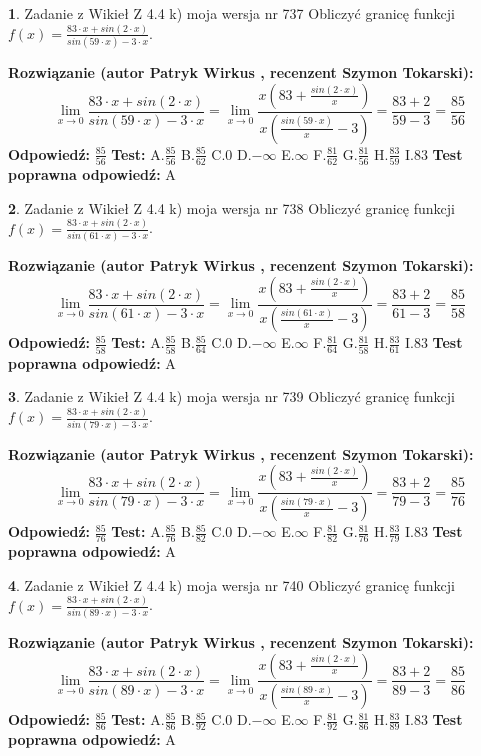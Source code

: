 \documentclass[12pt, a4paper]{article}
\theoremstyle{definition} %
\newtheorem{zad}{}
\newcommand{\zadStart}[1]{\begin{zad}#1\newline}
\newcommand{\zadStop}{\end{zad}}
\newcommand{\rozwStart}[2]{\noindent \textbf{Rozwiązanie (autor #1 , recenzent #2): }\newline}
\newcommand{\rozwStop}{\newline}
\newcommand{\odpStart}{\noindent \textbf{Odpowiedź:}\newline}
\newcommand{\odpStop}{\newline}
\newcommand{\testStart}{\noindent \textbf{Test:}\newline}
\newcommand{\testStop}{\newline}
\newcommand{\kluczStart}{\noindent \textbf{Test poprawna odpowiedź:}\newline}
\newcommand{\kluczStop}{\newline}
\begin{document}
\zadStart{Zadanie z Wikieł Z 4.4 k) moja wersja nr 737}
Obliczyć granicę funkcji $f(x)=\frac{83\cdot x +sin(2\cdot x)}{sin(59\cdot x) -3\cdot x}$.
\zadStop
\rozwStart{Patryk Wirkus}{Szymon Tokarski}
$$\lim\limits_{x\to 0}\frac{83\cdot x +sin(2\cdot x)}{sin(59\cdot x) -3\cdot x}
=\lim\limits_{x\to 0}\frac{x(83+\frac{sin(2\cdot x)}{x})}{x(\frac{sin(59\cdot x)}{x}-3)}
=\frac{83+2}{59-3} = \frac{85}{56}$$
\rozwStop
\odpStart
$\frac{85}{56}$
\odpStop
\testStart
A.$\frac{85}{56}$
B.$\frac{85}{62}$
C.$0$
D.$-\infty$
E.$\infty$
F.$\frac{81}{62}$
G.$\frac{81}{56}$
H.$\frac{83}{59}$
I.$83$
\testStop
\kluczStart
A
\kluczStop



\zadStart{Zadanie z Wikieł Z 4.4 k) moja wersja nr 738}
Obliczyć granicę funkcji $f(x)=\frac{83\cdot x +sin(2\cdot x)}{sin(61\cdot x) -3\cdot x}$.
\zadStop
\rozwStart{Patryk Wirkus}{Szymon Tokarski}
$$\lim\limits_{x\to 0}\frac{83\cdot x +sin(2\cdot x)}{sin(61\cdot x) -3\cdot x}
=\lim\limits_{x\to 0}\frac{x(83+\frac{sin(2\cdot x)}{x})}{x(\frac{sin(61\cdot x)}{x}-3)}
=\frac{83+2}{61-3} = \frac{85}{58}$$
\rozwStop
\odpStart
$\frac{85}{58}$
\odpStop
\testStart
A.$\frac{85}{58}$
B.$\frac{85}{64}$
C.$0$
D.$-\infty$
E.$\infty$
F.$\frac{81}{64}$
G.$\frac{81}{58}$
H.$\frac{83}{61}$
I.$83$
\testStop
\kluczStart
A
\kluczStop



\zadStart{Zadanie z Wikieł Z 4.4 k) moja wersja nr 739}
Obliczyć granicę funkcji $f(x)=\frac{83\cdot x +sin(2\cdot x)}{sin(79\cdot x) -3\cdot x}$.
\zadStop
\rozwStart{Patryk Wirkus}{Szymon Tokarski}
$$\lim\limits_{x\to 0}\frac{83\cdot x +sin(2\cdot x)}{sin(79\cdot x) -3\cdot x}
=\lim\limits_{x\to 0}\frac{x(83+\frac{sin(2\cdot x)}{x})}{x(\frac{sin(79\cdot x)}{x}-3)}
=\frac{83+2}{79-3} = \frac{85}{76}$$
\rozwStop
\odpStart
$\frac{85}{76}$
\odpStop
\testStart
A.$\frac{85}{76}$
B.$\frac{85}{82}$
C.$0$
D.$-\infty$
E.$\infty$
F.$\frac{81}{82}$
G.$\frac{81}{76}$
H.$\frac{83}{79}$
I.$83$
\testStop
\kluczStart
A
\kluczStop



\zadStart{Zadanie z Wikieł Z 4.4 k) moja wersja nr 740}
Obliczyć granicę funkcji $f(x)=\frac{83\cdot x +sin(2\cdot x)}{sin(89\cdot x) -3\cdot x}$.
\zadStop
\rozwStart{Patryk Wirkus}{Szymon Tokarski}
$$\lim\limits_{x\to 0}\frac{83\cdot x +sin(2\cdot x)}{sin(89\cdot x) -3\cdot x}
=\lim\limits_{x\to 0}\frac{x(83+\frac{sin(2\cdot x)}{x})}{x(\frac{sin(89\cdot x)}{x}-3)}
=\frac{83+2}{89-3} = \frac{85}{86}$$
\rozwStop
\odpStart
$\frac{85}{86}$
\odpStop
\testStart
A.$\frac{85}{86}$
B.$\frac{85}{92}$
C.$0$
D.$-\infty$
E.$\infty$
F.$\frac{81}{92}$
G.$\frac{81}{86}$
H.$\frac{83}{89}$
I.$83$
\testStop
\kluczStart
A
\kluczStop
\end{document}
